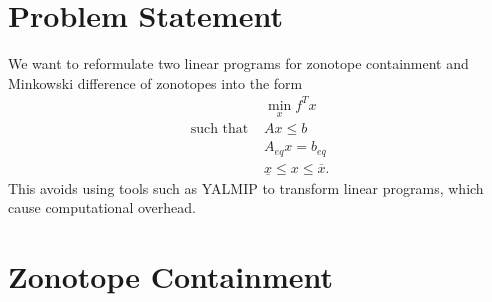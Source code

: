 \documentclass[10pt,a4paper]{article}
\renewcommand{\^}[1]{^{(#1)}}
\begin{document}
\section{Problem Statement}

We want to reformulate two linear programs for zonotope containment and Minkowski difference of zonotopes into the form
\begin{equation} \label{eq:standardForm}
\begin{split}
 & \min_x f^T x \\
 \text{such that } & Ax \leq b \\
 & A_{eq} x = b_{eq} \\
 & \underline{x} \leq x \leq \overline{x}.
\end{split}
\end{equation}
This avoids using tools such as YALMIP to transform linear programs, which cause computational overhead.

\section{Zonotope Containment}
\end{document}
